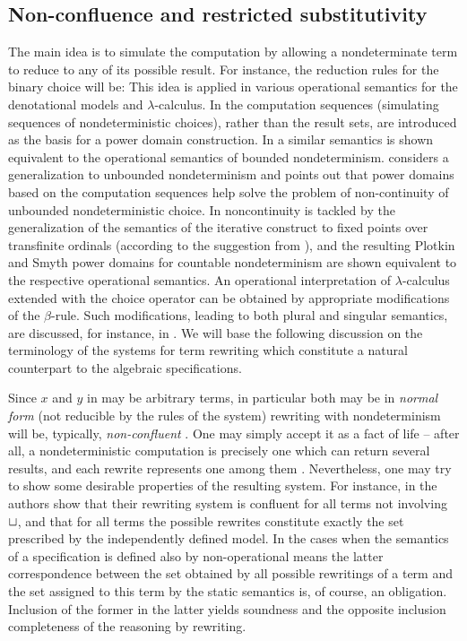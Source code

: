 {\subsection{Non-confluence and restricted substitutivity}\label{sub:71}
The main idea is to simulate the computation by allowing a nondeterminate term to reduce to any of its 
possible result. For instance, the reduction rules for the binary choice will be:
This idea is applied in various operational semantics for the
denotational models and $\lambda$-calculus. In \cite{c:66, c:67} the
computation sequences (simulating sequences of nondeterministic
choices), rather than the result sets, are introduced as the basis for
a power domain construction. In \cite{c:70} a similar semantics is
shown equivalent to the operational semantics of bounded
nondeterminism. \cite{c:5} considers a generalization to unbounded
nondeterminism and points out that power domains based on the
computation sequences help solve the problem of non-continuity of
unbounded nondeterministic choice. In \cite{c:3, c:105} noncontinuity
is tackled by the generalization of the semantics of the iterative
construct to fixed points over transfinite ordinals (according to the
suggestion from \cite{c:99}), and the resulting Plotkin and Smyth power
domains for countable nondeterminism are shown equivalent to the
respective operational semantics. An operational interpretation of
$\lambda$-calculus extended with the choice operator can be obtained
by appropriate modifications of the $\beta$-rule. Such modifications,
leading to both plural and singular semantics, are discussed, for
instance, in \cite{c:49, c:73, c:4}. We will base the following discussion on the
terminology of the systems for term rewriting which constitute a
natural counterpart to the algebraic specifications.

Since $x$ and $y$ in  may be arbitrary terms, in particular 
both may be in {\em normal form} (not 
reducible by the rules of the system) rewriting with nondeterminism will 
be, typically, {\em non-confluent} \cite{c:24, c:59, c:57, c:97, c:4, c:87}. 
One may simply accept it as a fact of life -- after all, a nondeterministic computation is 
precisely one which can return several results, and each rewrite represents one among them 
\cite{c:59, c:4, c:87}. 
Nevertheless, one may try to show some desirable properties of the resulting system. 
For instance, in \cite{c:4}  
the authors show that their rewriting system is confluent for all terms 
not involving $\sqcup$, and that for all 
terms the possible rewrites constitute exactly the set prescribed by the independently defined model. In 
the cases when the semantics of a specification is defined also by non-operational means the latter 
correspondence between the set obtained by all possible rewritings of a term and the set assigned to this 
term by the static semantics is, of course, an obligation. 
Inclusion of the former in the latter yields 
soundness and the opposite inclusion completeness of the reasoning by rewriting.  

}
